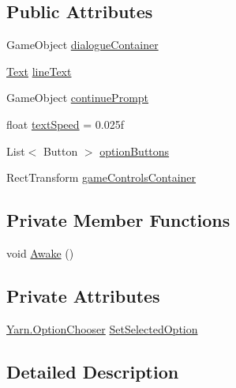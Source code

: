 \subsection*{Public Attributes}
\begin{DoxyCompactItemize}
\item 
Game\-Object \hyperlink{a00039_a2eaebc844d2ca982ec078708d070dbd3}{dialogue\-Container}
\item 
\hyperlink{a00026_a301aa7c866593a5b625a8fc158bbeacea9dffbf69ffba8bc38bc4e01abf4b1675}{Text} \hyperlink{a00039_a791f15a67a97fbe06ffc0bdf518edd04}{line\-Text}
\item 
Game\-Object \hyperlink{a00039_a74367b77a6a5218fa47dbe1d6266e4c6}{continue\-Prompt}
\item 
float \hyperlink{a00039_a6053aa65534195d626031413ef3a0828}{text\-Speed} = 0.\-025f
\item 
List$<$ Button $>$ \hyperlink{a00039_a090b7693e7ec6ec43c8c8e2b6b20b015}{option\-Buttons}
\item 
Rect\-Transform \hyperlink{a00039_a8344106eb22a0ad00e2400c2941b3e5f}{game\-Controls\-Container}
\end{DoxyCompactItemize}
\subsection*{Private Member Functions}
\begin{DoxyCompactItemize}
\item 
void \hyperlink{a00039_a6e57983db349b0d9e4526ecb7aa6fed2}{Awake} ()
\end{DoxyCompactItemize}
\subsection*{Private Attributes}
\begin{DoxyCompactItemize}
\item 
\hyperlink{a00026_a39866cbb03c03a35805d598b5d4ad553}{Yarn.\-Option\-Chooser} \hyperlink{a00039_a558f60ef9a7bcf887f015ba0d27aa6ef}{Set\-Selected\-Option}
\end{DoxyCompactItemize}


\subsection{Detailed Description}


